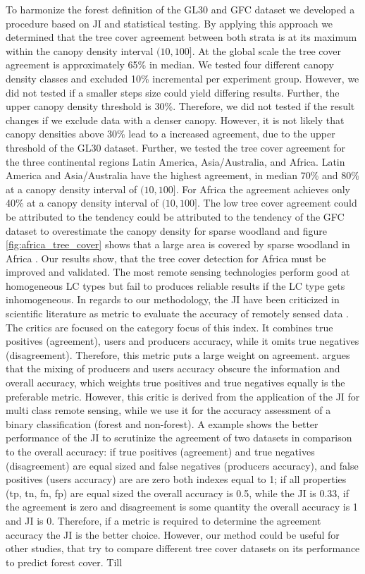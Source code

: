 		To harmonize the forest definition of the \ac{GL30} and \ac{GFC} dataset we developed a procedure based on \ac{JI} and statistical testing. By applying this approach we determined that the tree cover agreement between both strata is at its maximum within the canopy density interval $(10,100]$. At the global scale the tree cover agreement is approximately 65\% in median. We tested four different canopy density classes and excluded 10\% incremental per experiment group. However, we did not tested if a smaller steps size could yield differing results. Further, the upper canopy density threshold is 30\%. Therefore, we did not tested if the result changes if we exclude data with a denser canopy. However, it is not likely that canopy densities above 30\% lead to a increased agreement, due to the upper threshold of the \ac{GL30} dataset. Further, we tested the tree cover agreement for the three continental regions Latin America, Asia/Australia, and Africa. Latin America and Asia/Australia have the highest agreement, in median 70\% and 80\% at a canopy density interval of $(10,100]$. For Africa the agreement achieves only 40\% at a canopy density interval of $(10,100]$. The low tree cover agreement could be attributed to the tendency could be attributed to the tendency of the \ac{GFC} dataset to overestimate the canopy density for sparse woodland and figure \ref{fig:africa_tree_cover} shows that a large area is covered by sparse woodland in Africa \citep{Gross2017}. Our results show, that the tree cover detection for Africa must be improved and validated. The most remote sensing technologies perform good at homogeneous \ac{LC} types but fail to produces reliable results if the \ac{LC} type gets inhomogeneous. In regards to our methodology, the \ac{JI} have been criticized in scientific literature as metric to evaluate the accuracy of remotely sensed data \citep{Li2017a}. The critics are focused on the category focus of this index. It combines true positives (agreement), users and producers accuracy, while it omits true negatives (disagreement). Therefore, this metric puts a large weight on agreement. \citeauthor{Li2017a} argues that the mixing of producers and users accuracy obscure the information and overall accuracy, which weights true positives and true negatives equally is the preferable metric. However, this critic is derived from the application of the \ac{JI} for multi class remote sensing, while we use it for the accuracy assessment of a binary classification (forest and non-forest). A example shows the better performance of the \ac{JI} to scrutinize the agreement of two datasets in comparison to the overall accuracy: if true positives (agreement) and true negatives (disagreement) are equal sized and false negatives (producers accuracy), and false positives (users accuracy) are are zero both indexes equal to 1; if all properties (tp, tn, fn, fp) are equal sized the overall accuracy is 0.5, while the \ac{JI} is 0.33, if the agreement is zero and disagreement is some quantity the overall accuracy is 1 and \ac{JI} is 0. Therefore, if a metric is required to determine the agreement accuracy the \ac{JI} is the better choice. However, our method could be useful for other studies, that try to compare different tree cover datasets on its performance to predict forest cover. Till 